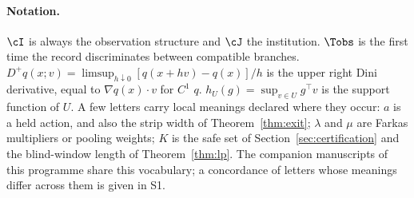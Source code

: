 \paragraph{Notation.} $\cI$ is always the observation structure and $\cJ$ the institution. $\Tobs$ is the first time the record discriminates between compatible branches. $D^+q(x;v)=\limsup_{h\downarrow0}[q(x+hv)-q(x)]/h$ is the upper right Dini derivative, equal to $\nabla q(x)\cdot v$ for $C^1$ $q$. $h_U(g)=\sup_{v\in U}g^\top v$ is the support function of $U$. A few letters carry local meanings declared where they occur: $a$ is a held action, and also the strip width of Theorem~\ref{thm:exit}; $\lambda$ and $\mu$ are Farkas multipliers or pooling weights; $K$ is the safe set of Section~\ref{sec:certification} and the blind-window length of Theorem~\ref{thm:lp}. The companion manuscripts of this programme share this vocabulary; a concordance of letters whose meanings differ across them is given in S1.
